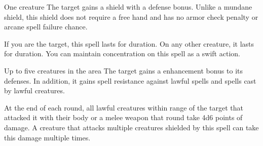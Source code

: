 \begin{spellheader}
    \spellrng{\rngclose}
\end{spellheader}
\begin{spelleffects}
    \begin{spelltarget}{One creature}
        \spelleffect The target gains a shield with a  defense bonus. \spellbonusscalingdescription Unlike a mundane shield, this shield does not require a free hand and has no armor check penalty or arcane spell failure chance.
    \end{spelltarget}
    \spellspecial If you are the target, this spell lasts for \durlong duration. On any other creature, it lasts for \durshort duration. You can maintain concentration on this spell as a swift action.
\end{spelleffects}
\begin{spellfooter}
    
\end{spellfooter}

\begin{spellheader}
    \spelldur{\durshort \dismissable}
\end{spellheader}
\begin{spelleffects}
    \begin{spelltargets}{Up to five creatures in the area}
        The target gains a  enhancement bonus to its defenses. In addition, it gains spell resistance against lawful spells and spells cast by lawful creatures.
        \par At the end of each round, all lawful creatures within \rngclose range of the target that attacked it with their body or a melee weapon that round take 4d6 points of damage. A creature that attacks multiple creatures shielded by this spell can take this damage multiple times.
    \end{spelltargets}
\end{spelleffects}
\begin{spellfooter}
    
\end{spellfooter}

